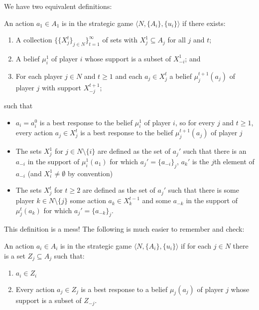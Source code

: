 \documentclass[10pt]{article}
\begin{document}
We have two equivalent definitions:

\begin{definition}
	An action $a_1 \in A_1$ is  in the strategic game $\langle N,\{A_i\},\{u_i\}\rangle$ if there exists:
	\begin{enumerate}
		\item A collection $\{\{X_j^t\}_{j\in N}\}_{t=1}^\infty$ of sets with $X_j^1 \subseteq A_j$ for all $j$ and $t$;
		\item A belief $\mu_i^1$ of player $i$ whose support is a subset of $X_{-i}^1$; and
		\item For each player $j \in N$ and $t \ge 1$ and each $a_j \in X_j^t$ a belief $\mu_j^{t+1}(a_j)$ of player $j$ with support $X_{-j}^{t+1}$;
	\end{enumerate}
	such that
	\begin{itemize}
		\item $a_i = a_i^0$ is a best response to the belief $\mu_i^1$ of player $i$, so for every $j$ and $t \ge 1$, every action $a_j \in X_j^t$ is a best response to the belief $\mu_j^{t+1}(a_j)$ of player $j$
		\item The sets $X_j^1$ for $j \in N \setminus \{i\}$ are defined as the set of $a_j'$ such that there is an $a_{-i}$ in the support of $\mu_i^1(a_1)$ for which $a_j' = \{a_{-i}\}_j$, \ie $a_k'$ is the $j$th element of $a_{-i}$ (and $X_i^1 \ne \emptyset$ by convention)
		\item The sets $X_j^t$ for $t \ge 2$ are defined as the set of $a_j'$ such that there is some player $k \in N \setminus \{j\}$ some action $a_k \in X_{k}^{t-1}$ and some $a_{-k}$ in the support of $\mu_j^t(a_k)$ for which $a_j' = \{a_{-k}\}_j$.
	\end{itemize}
\end{definition}

This definition is a mess! The following is much easier to remember and check:

\begin{definition}
	An action $a_i \in A_i$ is  in the strategic game $\langle N,\{A_i\},\{u_i\}\rangle$ if for each $j \in N$ there is a set $Z_j \subseteq A_j$ such that:
	\begin{enumerate}
		\item $a_i \in Z_i$
		\item Every action $a_j \in Z_j$ is a best response to a belief $\mu_j(a_j)$ of player $j$ whose support is a subset of $Z_{-j}$.
	\end{enumerate}
\end{definition}
\end{document}

